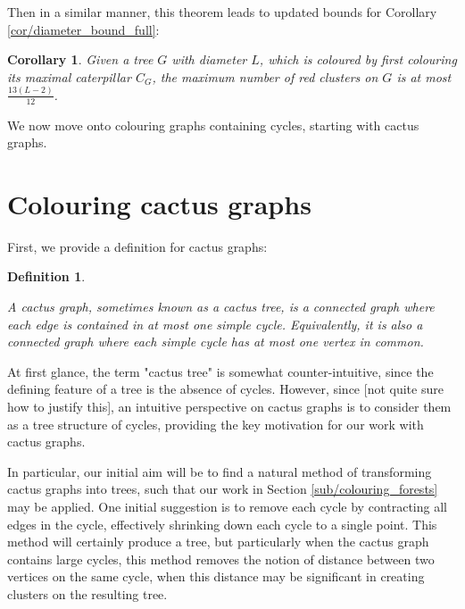 \documentclass{mpaper}
\newtheorem{definition}[theorem]{Definition}
\newtheorem{corollary}[theorem]{Corollary}
\begin{document}
  Then in a similar manner, this theorem leads to updated bounds for Corollary \ref{cor/diameter_bound_full}:

\begin{corollary}
\label{cor/diameter_bound_full_2}
Given a tree $G$ with diameter $L$, which is coloured by first colouring its maximal caterpillar $C_G$, the maximum number of red clusters on $G$ is at most $\frac{13(L-2)}{12}$.

\end{corollary}

We now move onto colouring graphs containing cycles, starting with cactus graphs.

\section{Colouring cactus graphs}
\label{sec/cactus_colouring}

First, we provide a definition for cactus graphs:

\begin{definition}
  \label{def/cactus_graphs}

  A \emph{cactus graph}, sometimes known as a cactus tree, is a connected graph where each edge is contained in at most one simple cycle. Equivalently, it is also a connected graph where each simple cycle has at most one vertex in common. 
\end{definition}

At first glance, the term "cactus tree" is somewhat counter-intuitive, since the defining feature of a tree is the absence of cycles. However, since [not quite sure how to justify this], an intuitive perspective on cactus graphs is to consider them as a tree structure of cycles, providing the key motivation for our work with cactus graphs.

In particular, our initial aim will be to find a natural method of transforming cactus graphs into trees, such that our work in Section \ref{sub/colouring_forests} may be applied. One initial suggestion is to remove each cycle by contracting all edges in the cycle, effectively shrinking down each cycle to a single point. This method will certainly produce a tree, but particularly when the cactus graph contains large cycles, this method removes the notion of distance between two vertices on the same cycle, when this distance may be significant in creating clusters on the resulting tree.
\end{document}
